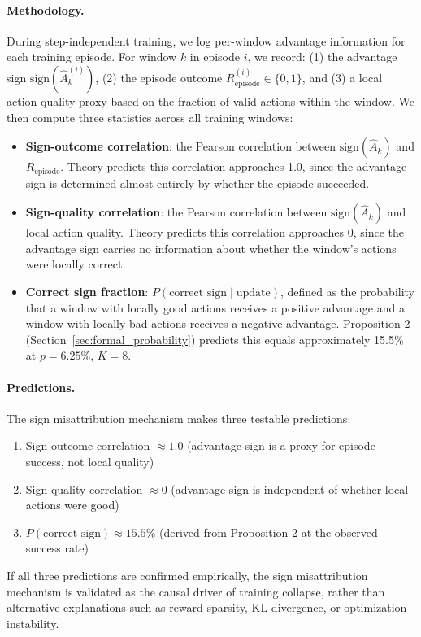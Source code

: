 \paragraph{Methodology.}
During step-independent training, we log per-window advantage information for each training episode. For window $k$ in episode $i$, we record: (1) the advantage sign $\text{sign}(\hat{A}_k^{(i)})$, (2) the episode outcome $R_{\text{episode}}^{(i)} \in \{0, 1\}$, and (3) a local action quality proxy based on the fraction of valid actions within the window. We then compute three statistics across all training windows:
\begin{itemize}
    \item \textbf{Sign-outcome correlation}: the Pearson correlation between $\text{sign}(\hat{A}_k)$ and $R_{\text{episode}}$. Theory predicts this correlation approaches 1.0, since the advantage sign is determined almost entirely by whether the episode succeeded.
    \item \textbf{Sign-quality correlation}: the Pearson correlation between $\text{sign}(\hat{A}_k)$ and local action quality. Theory predicts this correlation approaches 0, since the advantage sign carries no information about whether the window's actions were locally correct.
    \item \textbf{Correct sign fraction}: $P(\text{correct sign} \mid \text{update})$, defined as the probability that a window with locally good actions receives a positive advantage and a window with locally bad actions receives a negative advantage. Proposition 2 (Section~\ref{sec:formal_probability}) predicts this equals approximately 15.5\% at $p = 6.25\%$, $K = 8$.
\end{itemize}

\paragraph{Predictions.}
The sign misattribution mechanism makes three testable predictions:
\begin{enumerate}
    \item Sign-outcome correlation $\approx 1.0$ (advantage sign is a proxy for episode success, not local quality)
    \item Sign-quality correlation $\approx 0$ (advantage sign is independent of whether local actions were good)
    \item $P(\text{correct sign}) \approx 15.5\%$ (derived from Proposition 2 at the observed success rate)
\end{enumerate}
If all three predictions are confirmed empirically, the sign misattribution mechanism is validated as the causal driver of training collapse, rather than alternative explanations such as reward sparsity, KL divergence, or optimization instability.

